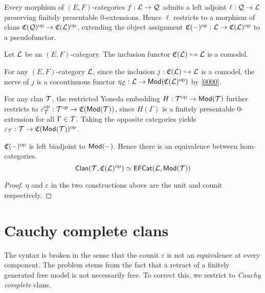 \documentclass[a4paper]{article}
\begin{document}
\begin{construction}
  Every morphism of $(E,F)$-categories $f : \mathcal{L} \to \mathcal{Q}$ admits a left adjoint $\ell : \mathcal{Q} \to \mathcal{L}$ preserving finitely presentable $0$-extensions.
  Hence $\ell$ restricts to a morphism of clans $\mathfrak{C}(\mathcal{Q})^{\mathrm{op}} \to \mathfrak{C}(\mathcal{L})^{\mathrm{op}}$, extending the object assignment $\mathfrak{C}(-)^{\mathrm{op}} : \mathcal{L} \to \mathfrak{C}(\mathcal{L})^{\mathrm{op}}$ to a pseudofunctor.
\end{construction}

\begin{remark}
  Let $\mathcal{L}$ be an $(E,F)$-category.
  The inclusion functor $\mathfrak{C}(\mathcal{L}) \hookrightarrow \mathcal{L}$ is a comodel.
\end{remark}

\begin{construction}
  For any $(E,F)$-category $\mathcal{L}$, since the inclusion $j : \mathfrak{C}(\mathcal{L}) \hookrightarrow \mathcal{L}$ is a comodel, the nerve of $j$ is a cocontinuous functor $\eta_{\mathcal{L}} : \mathcal{L} \to \mathsf{Mod}(\mathfrak{C}(\mathcal{L})^{\mathrm{op}})$ by \cref{0000}.
\end{construction}

\begin{construction}
  For any clan $\mathcal{T}$, the restricted Yoneda embedding $H : \mathcal{T}^{\mathrm{op}} \to \mathsf{Mod}(\mathcal{T})$ further restricts to $\varepsilon_{\mathcal{T}}^{\mathrm{op}} : \mathcal{T}^{\mathrm{op}} \to \mathfrak{C}(\mathsf{Mod}(\mathcal{T}))$, since $H(\Gamma)$ is a finitely presentable 0-extension for all $\Gamma \in \mathcal{T}$.
  Taking the opposite categories yields $\varepsilon_{\mathcal{T}} : \mathcal{T} \to \mathfrak{C}(\mathsf{Mod}(\mathcal{T}))^{\mathrm{op}}$.
\end{construction}

\begin{theorem}
  $\mathfrak{C}(-)^{\mathrm{op}}$ is left biadjoint to $\mathsf{Mod}(-)$.
  Hence there is an equivalence between hom-categories.
  \[
    \mathsf{Clan}(\mathcal{T},\mathfrak{C}(\mathcal{L})^{\mathrm{op}}) \simeq \mathsf{EFCat}(\mathcal{L},\mathsf{Mod}(\mathcal{T}))
  \]
\end{theorem}
\begin{proof}
  $\eta$ and $\varepsilon$ in the two constructions above are the unit and counit respectively.
\end{proof}

\section{Cauchy complete clans}

The syntax is broken in the sense that the counit $\varepsilon$ is not an equivalence at every component.
The problem stems from the fact that a retract of a finitely generated free model is not necessarily free.
To correct this, we restrict to \emph{Cauchy complete} clans.
\end{document}
